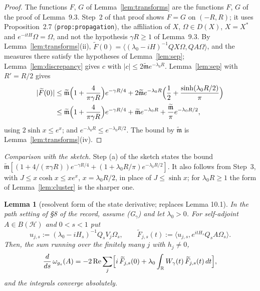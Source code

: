 \documentclass[11pt,a4paper]{article}
\newcommand{\R}{\mathbb{R}}
\newcommand{\HH}{\mathcal{H}}
\newcommand{\Om}{\Omega}
\newcommand{\ip}[2]{\langle #1,#2\rangle}
\newcommand{\Ft}{\widetilde F}
\newcommand{\mt}{\widetilde{\mathfrak m}}
\theoremstyle{plain}
\newtheorem{tlemma}{Lemma}
\theoremstyle{definition}
\begin{document}
\begin{proof}
The functions $F$, $G$ of Lemma~\ref{lem:transforms} are the functions $F$, $G$ of the proof of
Lemma~9.3.  Step~2 of that proof shows $F=G$ on $(-R,R)$; it uses Proposition~2.7
(\texttt{prop:propagation}), the affiliation of $X$, $\Om\in D(X)$, $X=X^*$ and
$e^{-itH}\Om=\Om$, and not the hypothesis $\gamma R\ge1$ of Lemma~9.3.  By
Lemma~\ref{lem:transforms}(ii), $\Ft(0)=\ip{(\lambda_0-iH)^{-1}QX\Om}{QA\Om}$, and the
measures there satisfy the hypotheses of Lemma~\ref{lem:sep}; Lemma~\ref{lem:discrepancy} gives
$c$ with $|c|\le2\mt e^{-\lambda_0R}$.  Lemma~\ref{lem:sep} with $R'=R/2$ gives
\begin{align*}
 |\Ft(0)|&\le\mt\Bigl(1+\frac4{\pi\gamma R}\Bigr)e^{-\gamma R/4}
 +2\mt e^{-\lambda_0R}\Bigl(\frac12+\frac{\sinh(\lambda_0R/2)}\pi\Bigr)\\
 &\le\mt\Bigl(1+\frac4{\pi\gamma R}\Bigr)e^{-\gamma R/4}+\mt e^{-\lambda_0R}
 +\frac{\mt}{\pi}e^{-\lambda_0R/2},
\end{align*}
using $2\sinh x\le e^x$; and $e^{-\lambda_0R}\le e^{-\lambda_0R/2}$.  The bound by $\mt$ is
Lemma~\ref{lem:transforms}(iv).
\end{proof}

\emph{Comparison with the sketch.}  Step (a) of the sketch states the bound
$\mt[(1+4/(\pi\gamma R))e^{-\gamma R/4}+(1+\lambda_0R/\pi)e^{-\lambda_0R/2}]$.  It also follows
from Step~3, with $J\le x\cosh x\le xe^x$, $x=\lambda_0R/2$, in place of $J\le\sinh x$; for
$\lambda_0R\ge1$ the form of Lemma~\ref{lem:cluster} is the sharper one.

\begin{tlemma}[resolvent form of the state derivative; replaces Lemma 10.1]\label{lem:deriv}
In the path setting of \S8 of the record, assume (G$_\gamma$) and let $\lambda_0>0$.  For
self-adjoint $A\in B(\HH)$ and $0<s<1$ put
\[
 u_{j,s}:=(\lambda_0-iH_s)^{-1}Q_sV_j\Om_s,\qquad
 \Ft_{j,s}(t):=\ip{u_{j,s}}{e^{itH_s}Q_sA\Om_s} .
\]
Then, the sum running over the finitely many $j$ with $h_j\ne0$,
\begin{equation}
 \frac{d}{ds}\,\omega_{g_s}(A)=-2\,\mathrm{Re}\sum_j\Bigl[i\,\Ft_{j,s}(0)
 +\lambda_0\int_\R W_\gamma(t)\,\Ft_{j,s}(t)\,dt\Bigr],
 \label{eq:deriv}
\end{equation}
and the integrals converge absolutely.
\end{tlemma}
\end{document}
